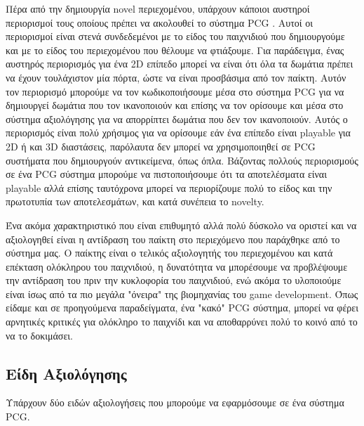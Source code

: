 Πέρα από την δημιουργία novel περιεχομένου, υπάρχουν κάποιοι αυστηροί περιορισμοί τους οποίους πρέπει να ακολουθεί το σύστημα PCG . Αυτοί οι περιορισμοί είναι στενά συνδεδεμένοι με το είδος του παιχνιδιού που δημιουργούμε και με το είδος του περιεχομένου που θέλουμε να φτιάξουμε. Για παράδειγμα, ένας αυστηρός περιορισμός για ένα 2D επίπεδο μπορεί να είναι ότι όλα τα δωμάτια πρέπει να έχουν τουλάχιστον μία πόρτα, ώστε να είναι προσβάσιμα από τον παίκτη. Αυτόν τον περιορισμό μπορούμε να τον κωδικοποιήσουμε μέσα στο σύστημα PCG για να δημιουργεί δωμάτια που τον ικανοποιούν και επίσης να τον ορίσουμε και μέσα στο σύστημα αξιολόγησης για να απορρίπτει δωμάτια που δεν τον ικανοποιούν. Αυτός ο περιορισμός είναι πολύ χρήσιμος για να ορίσουμε εάν ένα επίπεδο είναι playable για 2D ή και 3D διαστάσεις, παρόλαυτα δεν μπορεί να χρησιμοποιηθεί σε PCG συστήματα που δημιουργούν αντικείμενα, όπως όπλα. Βάζοντας πολλούς περιορισμούς σε ένα PCG σύστημα μπορούμε να πιστοποιήσουμε ότι τα αποτελέσματα είναι playable αλλά επίσης ταυτόχρονα μπορεί να περιορίζουμε πολύ το είδος και την πρωτοτυπία των αποτελεσμάτων, και κατά συνέπεια το novelty.
\par
Ένα ακόμα χαρακτηριστικό που είναι επιθυμητό αλλά πολύ δύσκολο να οριστεί και να αξιολογηθεί είναι η αντίδραση του παίκτη στο περιεχόμενο που παράχθηκε από το σύστημα μας. Ο παίκτης είναι ο τελικός αξιολογητής του περιεχομένου και κατά επέκταση ολόκληρου του παιχνιδιού, η δυνατότητα να μπορέσουμε να προβλέψουμε την αντίδραση του πριν την κυκλοφορία του παιχνιδιού, ενώ ακόμα το υλοποιούμε είναι ίσως από τα πιο μεγάλα "όνειρα" της βιομηχανίας του game development. Όπως είδαμε και σε προηγούμενα παραδείγματα, ένα "κακό" PCG σύστημα, μπορεί να φέρει αρνητικές κριτικές για ολόκληρο το παιχνίδι και να αποθαρρύνει πολύ το κοινό από το να το δοκιμάσει. 


\subsection{Είδη Αξιολόγησης}
Υπάρχουν δύο ειδών αξιολογήσεις που μπορούμε να εφαρμόσουμε σε ένα σύστημα PCG. 

